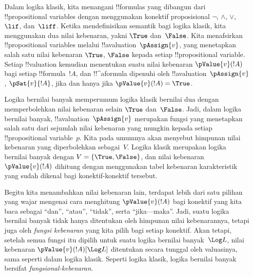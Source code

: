 \documentclass[../../../include/open-logic-section]{subfiles}
\begin{document}


Dalam logika klasik, kita menangani !!{formula}s yang dibangun dari
!!{propositional variable}s dengan menggunakan konektif proposisional
$\lnot$, $\land$, $\lor$, $\lif$, dan~$\liff$. Ketika mendefinisikan
semantik bagi logika klasik, kita menggunakan dua nilai kebenaran, yakni
$\True$ dan~$\False$. Kita menafsirkan !!{propositional variable}s melalui
!!a{valuation}~$\pAssign{v}$, yang menetapkan salah satu nilai kebenaran
$\True$, $\False$ kepada setiap !!{propositional variable}. Setiap
!!{valuation} kemudian menentukan suatu nilai kebenaran $\pValue{v}(!A)$
bagi setiap !!{formula}~$!A$, dan !!^a{formula} dipenuhi oleh
!!a{valuation}~$\pAssign{v}$, $\pSat{v}{!A}$, jika dan hanya jika
$\pValue{v}(!A)=\True$.

Logika bernilai banyak memperumum logika klasik bernilai dua dengan
memperbolehkan nilai kebenaran selain $\True$ dan~$\False$. Jadi, dalam
logika bernilai banyak, !!a{valuation}~$\pAssign{v}$ merupakan fungsi yang
menetapkan salah satu dari sejumlah nilai kebenaran yang mungkin kepada setiap
!!{propositional variable}~$p$. Kita pada umumnya akan menyebut himpunan nilai
kebenaran yang diperbolehkan sebagai~$V$. Logika klasik merupakan logika
bernilai banyak dengan $V=\{\True,\False\}$, dan nilai kebenaran
$\pValue{v}(!A)$ dihitung dengan menggunakan tabel kebenaran karakteristik
yang sudah dikenal bagi konektif-konektif tersebut.

Begitu kita menambahkan nilai kebenaran lain, terdapat lebih dari satu pilihan
yang wajar mengenai cara menghitung $\pValue{v}(!A)$ bagi konektif yang kita
baca sebagai ``dan'', ``atau'', ``tidak'', serta ``jika---maka''. Jadi, suatu
logika bernilai banyak tidak hanya ditentukan oleh himpunan nilai
kebenarannya, tetapi juga oleh \emph{fungsi kebenaran} yang kita pilih bagi
setiap konektif. Akan tetapi, setelah semua fungsi itu dipilih untuk suatu
logika bernilai banyak~$\Log L$, nilai kebenaran
$\pValue{v}(!A)[\Log L]$ ditentukan secara tunggal oleh valuasinya, sama
seperti dalam logika klasik. Seperti logika klasik, logika bernilai banyak
bersifat \emph{fungsional-kebenaran}.
\end{document}
